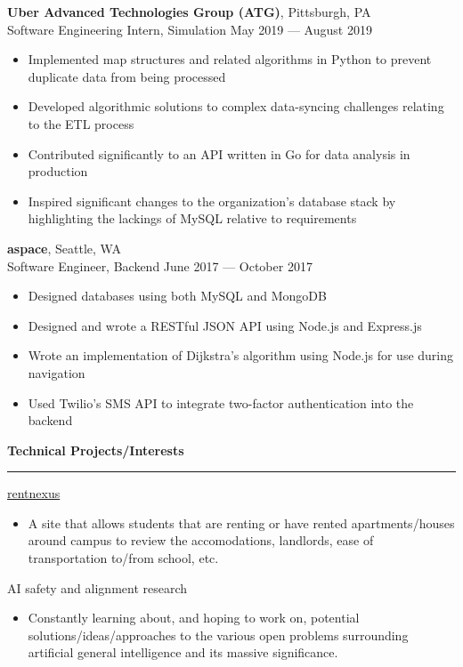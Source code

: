 \documentclass[11pt]{article}
\begin{document}
\begin{flushleft}
		\vspace{2.5mm}
		\textbf{Uber Advanced Technologies Group (ATG)}, Pittsburgh, PA\\
		{\small Software Engineering Intern, Simulation \hfill May 2019 --- August 2019}
		\begin{itemize}
			\item Implemented map structures and related algorithms in Python to prevent duplicate data from being processed
			\vspace{-1mm}
			\item Developed algorithmic solutions to complex data-syncing challenges relating to the ETL process
			\vspace{-1mm}
			\item Contributed significantly to an API written in Go for data analysis in production
			\vspace{-1mm}
			\item Inspired significant changes to the organization's database stack by highlighting the lackings of MySQL relative to requirements
		\end{itemize}
	
		\textbf{aspace}, Seattle, WA\\
		{\small Software Engineer, Backend \hfill June 2017 --- October 2017}
		\begin{itemize}
			\item Designed databases using both MySQL and MongoDB
			\vspace{-1mm}
			\item Designed and wrote a RESTful JSON API using Node.js and Express.js
			\vspace{-1mm}
			\item Wrote an implementation of Dijkstra's algorithm using Node.js for use during navigation
			\vspace{-1mm}
			\item Used Twilio's SMS API to integrate two-factor authentication into the backend
		\end{itemize}
		
		\vspace{1.75mm}
		{\large \raggedright \textbf{Technical Projects/Interests}}
		\vspace{1.5mm}
	
		\hrule
	
		\vspace{2.5mm}
		\href{https://rentnexus.net}{rentnexus}
		\begin{itemize}
			\item A site that allows students that are renting or have rented apartments/houses around campus to review the accomodations, landlords, ease of transportation to/from school, etc.
		\end{itemize}
		AI safety and alignment research
		\begin{itemize}
			\item Constantly learning about, and hoping to work on, potential solutions/ideas/approaches to the various open problems surrounding artificial general intelligence and its massive significance.
		\end{itemize}
		

\end{flushleft}
\end{document}
